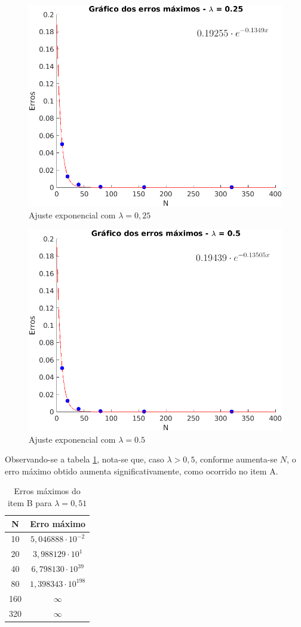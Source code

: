 \documentclass[12pt]{article}
\begin{document}
\begin{spacing}{1.5}
\begin{figure}[ht!]
    \centering
    \includegraphics[width=0.65\linewidth]{Primeira_Tarefa/ItemB/lambda0-25_Fit_Erro.png}
    \caption{Ajuste exponencial com $\lambda=0,25$}
    \label{fig:B_lambda0-25_Fit_Erro}
\end{figure} 
\begin{figure}[ht!]
    \centering
    \includegraphics[width=0.65\linewidth]{Primeira_Tarefa/ItemB/lambda0-5_Fit_Erro.png}
    \caption{Ajuste exponencial com $\lambda=0.5$}
    \label{fig:B_lambda0-5_Fit_Erro}
\end{figure} 

Observando-se a tabela \ref{table:B_erro_lambda0-51}, nota-se que, caso $\lambda > 0,5$, conforme aumenta-se $N$, o erro máximo obtido aumenta significativamente, como ocorrido no item A. 

\begin{table}[ht]
\centering 
\begin{tabular}{c c} 
\hline\hline 
\rule{0pt}{3ex} 
N & Erro máximo\\ [0.5ex] 
\hline 
\rule{0pt}{4ex}
        10  & $5,046888 \cdot 10^{-2}$  \\ 
        20  & $3,988129 \cdot 10^{1}$   \\ 
        40  & $6,798130 \cdot 10^{39}$  \\ 
        80  & $1,398343 \cdot 10^{198}$ \\ 
        160 & $\infty$                  \\ 
        320 & $\infty$                  \\ [1ex]
\hline
\end{tabular}
\caption{Erros máximos do item B para $\lambda = 0,51$} 
\label{table:B_erro_lambda0-51}
\end{table}


\end{spacing}
\end{document}
